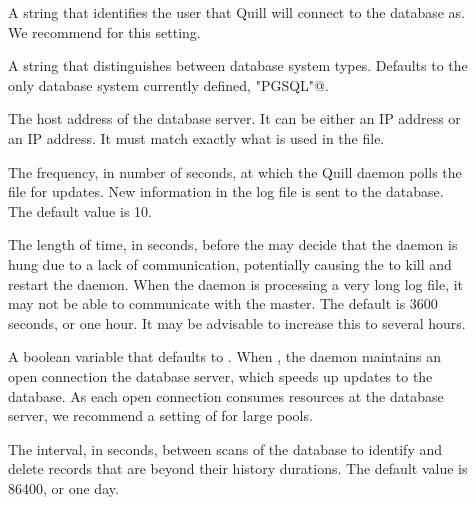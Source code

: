 \begin{description}
\item[]
	A string that identifies the  user that Quill will
    connect to the database as.
	We recommend  for this setting. 

\item[] \label{param:QuillDBType}
  A string that distinguishes between database system types.
  Defaults to the only database system currently defined,
  \verb@"PGSQL"@.

\item[] \label{param:QuillDBIPAddr}
  The host address of the database server. It can be either an IP address
  or an IP address.
  It must match exactly what is used in the  file.

\item[] \label{param:QuillPollingPeriod}
  The frequency, in number of seconds, at which the Quill daemon
  polls the file  for updates.
  New information in the log file is sent to the database.
  The default value is 10.

\item[]
  \label{param:QuillNotRespondingTimeout}
  The length of time, in seconds, before the 
  may decide that the  daemon is hung due to 
  a lack of communication,
  potentially causing  the  to kill and
  restart the  daemon.
  When the  daemon is processing a very long log file, it 
  may not be able to communicate with the master. 
  The default is 3600 seconds, or one hour. It may be
  advisable to increase this to several hours. 

\item[] \label{param:QuillMaintainDBConn}
  A boolean variable that defaults to .
  When , the  daemon
  maintains an open connection the database server,
  which speeds up updates to the database.
  As each open connection consumes resources at the database server,
  we recommend a setting of  for large pools.

\item[] 
  \label{param:QuillDatabasePurgeInterval}
  The interval, in seconds, between scans of the database to identify and
  delete records that are beyond their history durations. 
  The default value is 86400, or one day.


\end{description}
